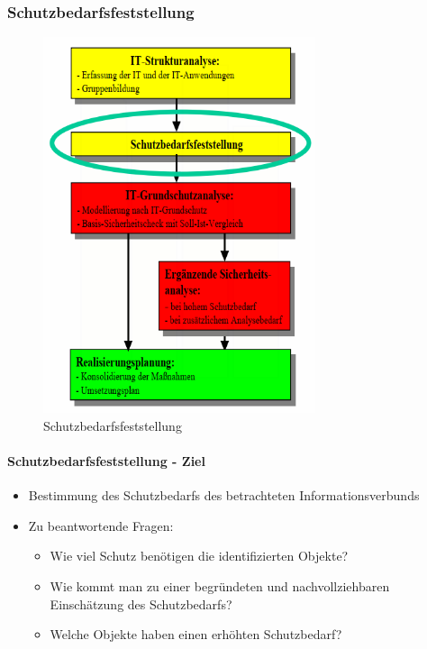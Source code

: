 \documentclass[10pt,a4paper]{article}
\begin{document}
\subsubsection*{Schutzbedarfsfeststellung}
\begin{figure}[H]
    \begin{center}
    \includegraphics[width=8cm]{images/Schutzbedarfsfeststellung.png}
    \caption{Schutzbedarfsfeststellung}
    \label{Schutzbedarfsfeststellung}
    \end{center}
\end{figure}

\paragraph*{Schutzbedarfsfeststellung - Ziel}
\begin{itemize}[noitemsep,topsep=0pt,leftmargin=*]
    \item Bestimmung des Schutzbedarfs des
    betrachteten Informationsverbunds
    \item Zu beantwortende Fragen:
    \begin{itemize}[noitemsep,topsep=0pt,leftmargin=*]
        \item Wie viel Schutz benötigen die identifizierten
        Objekte?
        \item Wie kommt man zu einer begründeten und
        nachvollziehbaren Einschätzung des
        Schutzbedarfs?
        \item Welche Objekte haben einen erhöhten
        Schutzbedarf?
    \end{itemize}
\end{itemize}
\end{document}
